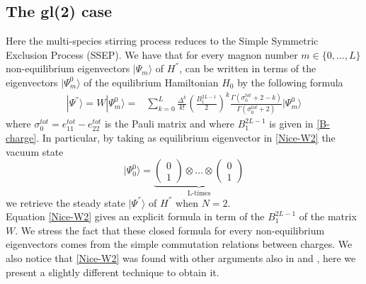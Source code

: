 \documentclass[10pt]{article}
\numberwithin{equation}{section}
\numberwithin{equation}{subsection}
\begin{document}
\subsection{The gl(2) case}\label{SubsectionGL2}
Here the multi-species stirring process reduces to the Simple Symmetric Exclusion Process (SSEP). We have that for every magnon number $m\in\{0,\ldots,L\}$ non-equilibrium eigenvectors $|\Psi_{m}\rangle$ of $H^{''}$, can be written in terms of the eigenvectors $|\Psi_{m}^{0}\rangle$ of the equilibrium Hamiltonian $H_{0}$ by the following formula 
\begin{equation}\label{Nice-W2}
	\begin{split}
		|\Psi^{''}\rangle=W|\Psi_{m}^{0}\rangle=&	\sum_{k=0}^{L}\frac{\Delta^{k}}{k!}\left(\frac{B_{1}^{2L-1}}{2}\right)^{k}\frac{\Gamma(\sigma_{0}^{tot}+2-k)}{\Gamma(\sigma_{0}^{tot}+2)}|\Psi_{m}^{0}\rangle
	\end{split}
\end{equation}
where $\sigma_{0}^{tot}=e_{11}^{tot}-e_{22}^{tot}$ is the Pauli matrix and where $B_{1}^{2L-1}$ is given in \eqref{B-charge}. In particular, by taking as equilibrium eigenvector in \eqref{Nice-W2} the vacuum state 
\begin{equation}
	|\Psi_{0}^{0}\rangle=\underbrace{\begin{pmatrix}
		0\\1
	\end{pmatrix}\otimes \ldots\otimes \begin{pmatrix}
	0\\
	1
\end{pmatrix}}_{\text{L-times}}
\end{equation} we retrieve the steady state $|\Psi^{''}\rangle$ of $H^{''}$ when $N=2$. \\
Equation \eqref{Nice-W2} gives an explicit formula in term of the $B_{1}^{2L-1}$ of the matrix $W$. We stress the fact that these closed formula for every non-equilibrium eigenvectors comes from the simple commutation relations between charges. We also notice that \eqref{Nice-W2} was found with other arguments also in \cite{frassek2020duality} and \cite{frassek2020eigenstates}, here we present a slightly different technique to obtain it. 
\end{document}
